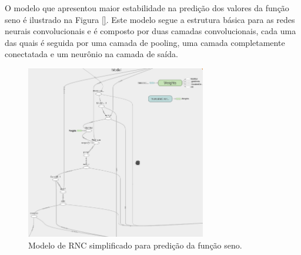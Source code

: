 \documentclass[a4paper,10pt]{report}
\begin{document}
O modelo que apresentou maior estabilidade na predição dos valores
da função seno é ilustrado na Figura \ref{}. Este modelo segue a
estrutura básica para as redes neurais convolucionais e é composto
por duas camadas convolucionais, cada uma das quais é seguida por uma
camada de pooling, uma camada completamente conectatada e um
neurônio na camada de saída.

\begin{figure}[htp]
\begin{center}
  \includegraphics[width=0.7\textwidth]{cnn_model}
  \caption{Modelo de RNC simplificado para predição da função seno.}
  \label{fig:rncComplete}
\end{center}
\end{figure}
\end{document}
